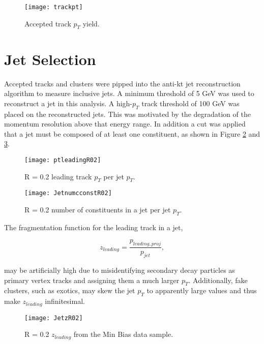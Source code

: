 \begin{figure}[h]
\texttt{[image: trackpt]}
\centering
\caption{Accepted track $p_{T}$ yield.}
\label{fig:hybtrackpt}
\end{figure}


\section{Jet Selection}

Accepted tracks and clusters were pipped into the anti-kt jet reconstruction algorithm to measure inclusive jets.  A minimum threshold of 5 GeV was used to reconstruct a jet in this analysis.  A high-$p_{T}$ track threshold of 100 GeV was placed on the reconstructed jets.  This was motivated by the degradation of the momentum resolution above that energy range.  In addition a cut was applied that a jet must be composed of at least one constituent, as shown in Figure \ref{fig:JetPt} and \ref{fig:JetConst}.

\begin{figure}[h]
\texttt{[image: ptleadingR02]}
\centering
\caption{R = 0.2 leading track $p_{T}$ per jet $p_{T}$.}
\label{fig:JetPt}
\end{figure}

\begin{figure}[h]
\texttt{[image: JetnumcconstR02]}
\centering
\caption{R = 0.2 number of constituents in a jet per jet $p_{T}$.}
\label{fig:JetConst}
\end{figure}



The fragmentation function for the leading track in a jet,

\begin{equation}
z_{leading} = \frac{ p_{leading, proj} }{ p_{jet} },
\label{eq:zleading}
\end{equation}

\noindent
may be artificially high due to misidentifying secondary decay particles as primary vertex tracks and assigning them a much larger $p_{T}$.  Additionally, fake clusters, such as exotics, may skew the jet $p_{T}$ to apparently large values and thus make $z_{leading}$ infinitesimal.  

\begin{figure}[h]
\texttt{[image: JetzR02]}
\centering
\caption{R = 0.2 $z_{leading}$ from the Min Bias data sample.}
\label{fig:Jetz}
\end{figure}

